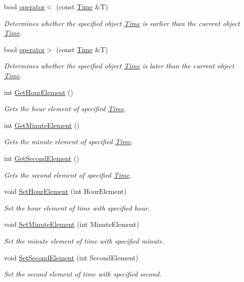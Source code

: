 \begin{DoxyCompactItemize}
bool \hyperlink{class_time_a2105a3d96442b30c78de1c39cfe78a43}{operator$<$} (const \hyperlink{class_time}{Time} \&T)
\begin{DoxyCompactList}\small\item\em Determines whether the specified object \hyperlink{class_time}{Time} is earlier than the current object \hyperlink{class_time}{Time}. \end{DoxyCompactList}\item 
bool \hyperlink{class_time_a5685f6f63cfad7d5e87aaac121bdc455}{operator$>$} (const \hyperlink{class_time}{Time} \&T)
\begin{DoxyCompactList}\small\item\em Determines whether the specified object \hyperlink{class_time}{Time} is later than the current object \hyperlink{class_time}{Time}. \end{DoxyCompactList}\item 
int \hyperlink{class_time_a48e43f8a54d938d4ffbf6443c73b4ffd}{Get\-Hour\-Element} ()
\begin{DoxyCompactList}\small\item\em Gets the hour element of specified \hyperlink{class_time}{Time}. \end{DoxyCompactList}\item 
int \hyperlink{class_time_a1aa88252331ef2e9f91a3ffe82e3d378}{Get\-Minute\-Element} ()
\begin{DoxyCompactList}\small\item\em Gets the minute element of specified \hyperlink{class_time}{Time}. \end{DoxyCompactList}\item 
int \hyperlink{class_time_a998ba1fdc211afdc48bae6b74412f609}{Get\-Second\-Element} ()
\begin{DoxyCompactList}\small\item\em Gets the second element of specified \hyperlink{class_time}{Time}. \end{DoxyCompactList}\item 
void \hyperlink{class_time_a97e5d72787a0b47c786349df031b44e8}{Set\-Hour\-Element} (int Hour\-Element)
\begin{DoxyCompactList}\small\item\em Set the hour element of time with specified hour. \end{DoxyCompactList}\item 
void \hyperlink{class_time_a5cbba1ef9416cc8466b60e2ef789bd86}{Set\-Minute\-Element} (int Minute\-Element)
\begin{DoxyCompactList}\small\item\em Set the minute element of time with specified minute. \end{DoxyCompactList}\item 
void \hyperlink{class_time_ad100ad8e6e9bc35043881c697f7efef1}{Set\-Second\-Element} (int Second\-Element)
\begin{DoxyCompactList}\small\item\em Set the second element of time with specified second. \end{DoxyCompactList}\end{DoxyCompactItemize}

